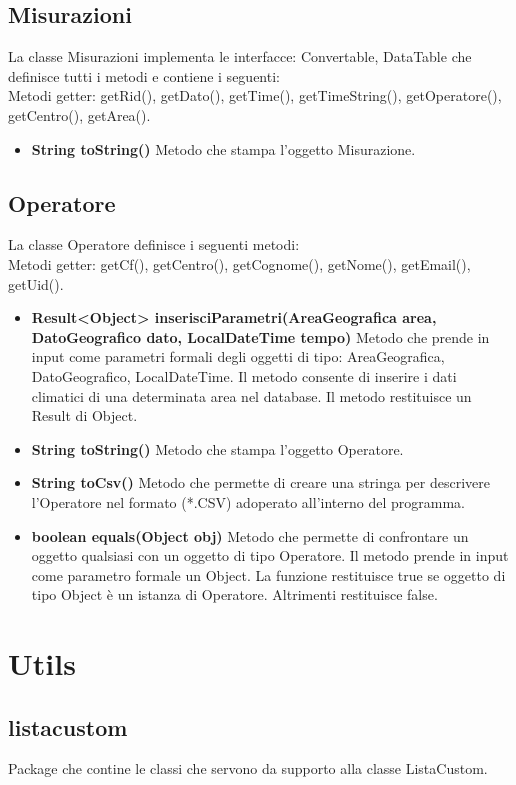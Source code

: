 \documentclass[a4paper, 12pt]{report}
\begin{document}
			\subsection{Misurazioni}
			La classe Misurazioni implementa le interfacce: Convertable, DataTable che definisce tutti i metodi e contiene i seguenti:\\
			Metodi getter: getRid(), getDato(), getTime(), getTimeString(), getOperatore(), getCentro(), getArea().
			\begin{itemize}
			\item \textbf{String toString()}
			Metodo che stampa l'oggetto Misurazione.
			\end{itemize}

			\subsection{Operatore}
			La classe Operatore definisce i seguenti metodi:\\
			Metodi getter: getCf(), getCentro(), getCognome(), getNome(), getEmail(), getUid().
			\begin{itemize}
			\item \textbf{Result<Object> inserisciParametri(AreaGeografica area, DatoGeografico dato, LocalDateTime tempo)}
			Metodo che prende in input come parametri formali degli oggetti di tipo: AreaGeografica, DatoGeografico, LocalDateTime.
			Il metodo consente di inserire i dati climatici di una determinata area nel database. Il metodo restituisce un Result di Object.
			\item \textbf{String toString()}
			Metodo che stampa l'oggetto Operatore.
			\item \textbf{String toCsv()}
			Metodo che permette di creare una stringa per descrivere l'Operatore nel formato (*.CSV) adoperato all'interno del programma.
			\item \textbf{boolean equals(Object obj)}
			Metodo che permette di confrontare un oggetto qualsiasi con un oggetto di tipo Operatore. Il metodo prende in input come parametro formale un Object. La funzione restituisce true se oggetto di tipo Object è un istanza di Operatore. Altrimenti restituisce false.
			\end{itemize}

		\section{Utils}
			\subsection{listacustom}
			Package che contine le classi che servono da supporto alla classe ListaCustom.
\end{document}
